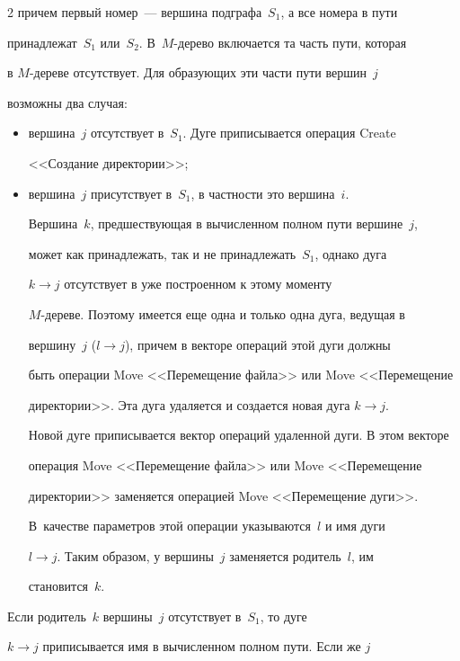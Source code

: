 \begin{multicols}{2}
причем первый номер~--- вершина подграфа~$S_1$, а все номера в пути 


принадлежат~$S_1$ или~$S_2$. В~$M$-дерево включается та часть пути, которая 


в $M$-дереве отсутствует. Для образующих эти части пути вершин~$j$ 


возможны два случая:


      \begin{itemize}


\item вершина~$j$ отсутствует в~$S_1$. Дуге приписывается операция Create 


<<Создание директории>>;


\item вершина~$j$ присутствует в~$S_1$, в частности это вершина~$i$. 


Вершина~$k$, предшествующая в вычисленном полном пути вершине~$j$, 


может как принадлежать, так и не принадлежать~$S_1$, однако дуга 


$k\rightarrow j$ отсутствует в уже построенном к этому моменту 


$M$-дереве. Поэтому имеется еще одна и только одна дуга, ведущая в 


вершину~$j$ ($l\rightarrow j$), причем в векторе операций этой дуги должны 


быть операции Move <<Перемещение файла>> или Move <<Перемещение 


директории>>.  Эта дуга удаляется и создается новая дуга $k\rightarrow j$. 


Новой дуге приписывается вектор операций удаленной дуги. В этом векторе 


операция Move <<Перемещение файла>> или Move <<Перемещение 


директории>> заменяется операцией Move <<Перемещение дуги>>. 


В~качестве параметров этой операции указываются~$l$ и имя дуги 


$l\rightarrow j$. Таким образом, у вершины~$j$ заменяется родитель~$l$, им 


становится~$k$. 


\end{itemize}





      Если родитель~$k$ вершины~$j$ отсутствует в~$S_1$, то дуге 


$k\rightarrow j$ приписывается имя в вычисленном полном пути. Если же $j$ 



\end{multicols}
